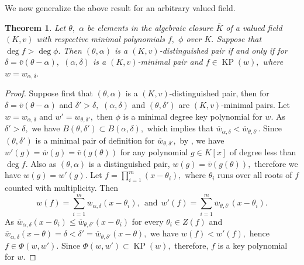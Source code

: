 \documentclass[11pt]{amsart}
\newtheorem{theorem}{Theorem}[section]
\theoremstyle{definition}
\theoremstyle{remark}
\numberwithin{equation}{section}
\begin{document}
 We now generalize the above result for an arbitrary valued field.
 \begin{theorem}\label{3.9}
 	Let $\theta,$ $\alpha$ be elements in the algebraic  closure $\overline{K}$ of a valued field $(K,v)$ with respective minimal polynomials $f,$ $\phi$ over $K.$ Suppose that $\deg f>\deg \phi.$ Then $(\theta,\alpha)$ is a $(K,v)$-distinguished pair if and only if for $\delta=\bar{v}(\theta-\alpha),$ $(\alpha,\delta)$ is a $(K,v)$-minimal pair and $f\in \operatorname{KP}(w),$ where $w={w}_{\alpha,\delta}.$	
 \end{theorem}
\begin{proof}
Suppose first that $(\theta,\alpha)$ is a $(K,v)$-distinguished pair, then for $\delta=\bar{v}(\theta-\alpha)$ and $\delta'>\delta,$ $(\alpha,\delta)$ and $(\theta,\delta')$ are $(K,v)$-minimal pairs. Let $w=w_{\alpha,\delta}$ and $w'=w_{\theta,\delta'},$ then $\phi$ is a minimal degree key polynomial for $w.$ As $\delta'>\delta,$ we have $B(\theta,\delta')\subset B(\alpha,\delta),$ which implies that $\overline{w}_{\alpha,\delta}<\overline{w}_{\theta,\delta'}.$
	Since $(\theta,\delta')$ is a minimal pair of definition for $\overline{w}_{\theta,\delta'},$ by \cite[Lemma 3.6]{W}, we have $w'(g)=\overline{w}(g)=\bar{v}(g(\theta))$ for any polynomial $g\in K[x]$ of degree less than $\deg f.$ Also as $(\theta,\alpha)$ is a distinguished pair, $w(g)=\bar{v}(g(\theta)),$ therefore we have $w(g)=w'(g).$ Let $f=\prod_{i=1}^{m}(x-\theta_i),$  where $\theta_i$ runs over all roots of $f$ counted with multiplicity. Then
	\[w(f)=\sum_{i=1}^m\overline{w}_{\alpha,\delta}(x-\theta_i),\ \ \text{and}\  \ 
	w'(f)=\sum_{i=1}^m\overline{w}_{\theta,\delta'}(x-\theta_i).\]
	As $\overline{w}_{\alpha,\delta}(x-\theta_i)\leq \overline{w}_{\theta,\delta'}(x-\theta_i)$ for every $\theta_i \in Z(f)$ and $ \overline{w}_{\alpha,\delta}(x-\theta)=\delta<\delta'= \overline{w}_{\theta,\delta'}(x-\theta),$ we have $ w(f)<w'(f),$ hence $f\in \Phi(w,w').$ Since $\Phi(w,w')\subset \operatorname{KP}(w),$ therefore, $f$ is a key polynomial for $w.$
	

\end{proof}
\end{document}
